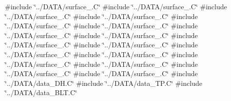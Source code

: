 {\ttfamily \#include \char`\"{}../\+D\+A\+T\+A/surface\+\_.\+C\char`\"{}}\newline
{\ttfamily \#include \char`\"{}../\+D\+A\+T\+A/surface\+\_.\+C\char`\"{}}\newline
{\ttfamily \#include \char`\"{}../\+D\+A\+T\+A/surface\+\_.\+C\char`\"{}}\newline
{\ttfamily \#include \char`\"{}../\+D\+A\+T\+A/surface\+\_.\+C\char`\"{}}\newline
{\ttfamily \#include \char`\"{}../\+D\+A\+T\+A/surface\+\_.\+C\char`\"{}}\newline
{\ttfamily \#include \char`\"{}../\+D\+A\+T\+A/surface\+\_.\+C\char`\"{}}\newline
{\ttfamily \#include \char`\"{}../\+D\+A\+T\+A/surface\+\_.\+C\char`\"{}}\newline
{\ttfamily \#include \char`\"{}../\+D\+A\+T\+A/surface\+\_.\+C\char`\"{}}\newline
{\ttfamily \#include \char`\"{}../\+D\+A\+T\+A/surface\+\_.\+C\char`\"{}}\newline
{\ttfamily \#include \char`\"{}../\+D\+A\+T\+A/surface\+\_.\+C\char`\"{}}\newline
{\ttfamily \#include \char`\"{}../\+D\+A\+T\+A/surface\+\_.\+C\char`\"{}}\newline
{\ttfamily \#include \char`\"{}../\+D\+A\+T\+A/surface\+\_.\+C\char`\"{}}\newline
{\ttfamily \#include \char`\"{}../\+D\+A\+T\+A/surface\+\_.\+C\char`\"{}}\newline
{\ttfamily \#include \char`\"{}../\+D\+A\+T\+A/surface\+\_.\+C\char`\"{}}\newline
{\ttfamily \#include \char`\"{}../\+D\+A\+T\+A/surface\+\_.\+C\char`\"{}}\newline
{\ttfamily \#include \char`\"{}../\+D\+A\+T\+A/surface\+\_.\+C\char`\"{}}\newline
{\ttfamily \#include \char`\"{}../\+D\+A\+T\+A/data\+\_\+\+D\+H.\+C\char`\"{}}\newline
{\ttfamily \#include \char`\"{}../\+D\+A\+T\+A/data\+\_\+\+T\+P.\+C\char`\"{}}\newline
{\ttfamily \#include \char`\"{}../\+D\+A\+T\+A/data\+\_\+\+B\+L\+T.\+C\char`\"{}}\newline
